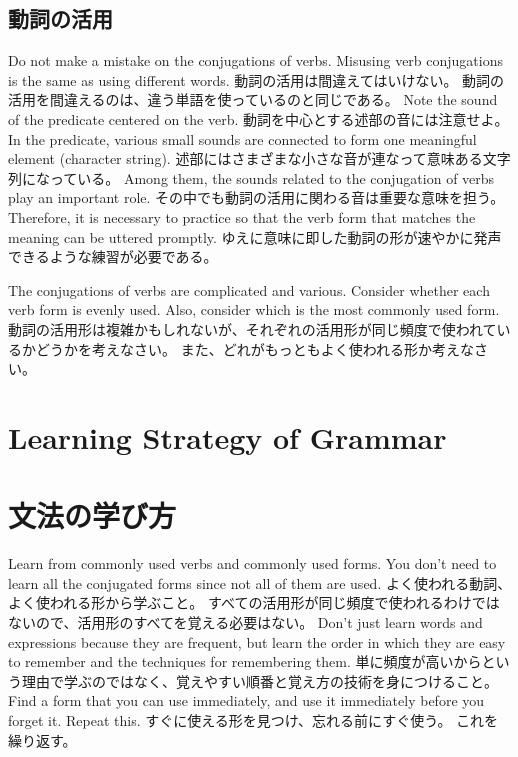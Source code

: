 \documentclass[uplatex,dvipdfmx,b5paper,english,10pt]{jsbook}
\begin{document}
\subsection{動詞の活用}
\fi
\ifEnglish
Do not make a mistake on the conjugations of verbs.
Misusing verb conjugations is the same as using different words.
\else
動詞の活用は間違えてはいけない。
動詞の活用を間違えるのは、違う単語を使っているのと同じである。
\fi
\ifEnglish
Note the sound of the predicate centered on the verb.
\else
動詞を中心とする述部の音には注意せよ。
\fi
\ifEnglish
In the predicate, various small sounds are connected to form one meaningful element (character string).
\else
述部にはさまざまな小さな音が連なって意味ある文字列になっている。
\fi
\ifEnglish
Among them, the sounds related to the conjugation of verbs play an important role.
\else
その中でも動詞の活用に関わる音は重要な意味を担う。
\fi
\ifEnglish
Therefore, it is necessary to practice so that the verb form that matches the meaning can be uttered promptly.
\else
ゆえに意味に即した動詞の形が速やかに発声できるような練習が必要である。
\fi

\begin{toiquestion}
\ifEnglish
The conjugations of verbs are complicated and various.
Consider whether each verb form is evenly used.
Also, consider which is the most commonly used form.
\else
動詞の活用形は複雑かもしれないが、それぞれの活用形が同じ頻度で使われているかどうかを考えなさい。
また、どれがもっともよく使われる形か考えなさい。
\fi
\end{toiquestion}

\ifEnglish
\section{Learning Strategy of Grammar}
\else
\section{文法の学び方}
\fi

\ifEnglish
Learn from commonly used verbs and commonly used forms. You don't need to learn all the conjugated forms since not all of them are used.
\else
よく使われる動詞、よく使われる形から学ぶこと。
すべての活用形が同じ頻度で使われるわけではないので、活用形のすべてを覚える必要はない。
\fi
\ifEnglish
Don't just learn words and expressions because they are frequent, but learn the order in which they are easy to remember and the techniques for remembering them.
\else
単に頻度が高いからという理由で学ぶのではなく、覚えやすい順番と覚え方の技術を身につけること。
\fi
\ifEnglish
Find a form that you can use immediately, and use it immediately before you forget it. Repeat this.
\else
すぐに使える形を見つけ、忘れる前にすぐ使う。
これを繰り返す。
\fi
\end{document}
